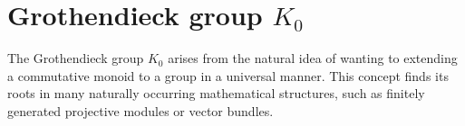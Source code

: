 \documentclass[12pt]{report}
\numberwithin{equation}{section}
\begin{document}
%	
%		
%		
%		
%		
%		
%		

	
	\chapter{Grothendieck group $K_0$}
	The Grothendieck group $K_0$ arises from the natural idea of wanting to extending a commutative monoid to a group in a universal manner. This concept finds its roots in many naturally occurring mathematical structures, such as finitely generated projective modules or vector bundles. 
	
\end{document}
